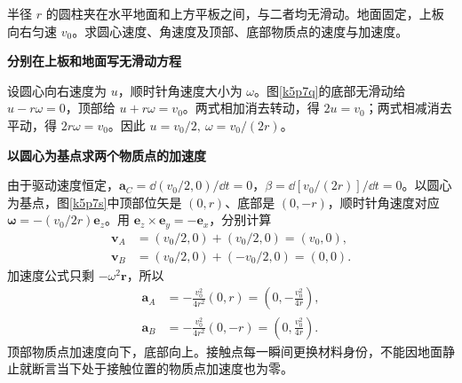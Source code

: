 \begin{question}\begin{example}[两平板之间的圆柱]\label{k5p7}
半径 $r$ 的圆柱夹在水平地面和上方平板之间，与二者均无滑动。地面固定，上板向右匀速 $v_0$。求圆心速度、角速度及顶部、底部物质点的速度与加速度。\end{example}
\end{question}
\begin{solution}\textbf{分别在上板和地面写无滑动方程}\par\nobreak
设圆心向右速度为 $u$，顺时针角速度大小为 $\omega$。图\ref{k5p7q}的底部无滑动给 $u-r\omega=0$，顶部给 $u+r\omega=v_0$。两式相加消去转动，得 $2u=v_0$；两式相减消去平动，得 $2r\omega=v_0$。因此 $\boxed{u=v_0/2,\ \omega=v_0/(2r)}$。



\par\medskip{}\noindent\textbf{以圆心为基点求两个物质点的加速度}\par\nobreak
由于驱动速度恒定，$\bm a_C=\dd(v_0/2,0)/\dd t=0$，$\beta=\dd[v_0/(2r)]/\dd t=0$。以圆心为基点，图\ref{k5p7s}中顶部位矢是 $(0,r)$、底部是 $(0,-r)$，顺时针角速度对应 $\bm\omega=-(v_0/2r)\bm e_z$。用 $\bm e_z\times\bm e_y=-\bm e_x$，分别计算
\begin{align*}
 \bm v_A&=(v_0/2,0)+(v_0/2,0)=(v_0,0),\\
 \bm v_B&=(v_0/2,0)+(-v_0/2,0)=(0,0).
\end{align*}
加速度公式只剩 $-\omega^2\bm r$，所以
\begin{align*}
 \bm a_A&=-\frac{v_0^2}{4r^2}(0,r)=\left(0,-\frac{v_0^2}{4r}\right),\\
 \bm a_B&=-\frac{v_0^2}{4r^2}(0,-r)=\left(0,\frac{v_0^2}{4r}\right).
\end{align*}
顶部物质点加速度向下，底部向上。接触点每一瞬间更换材料身份，不能因地面静止就断言当下处于接触位置的物质点加速度也为零。\end{solution}

